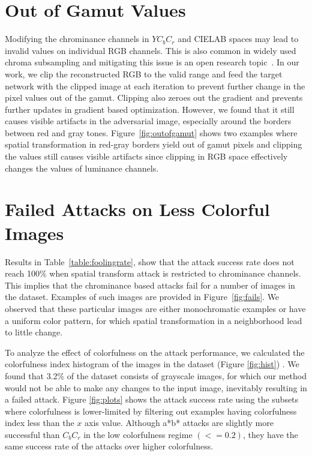\section{Out of Gamut Values}
Modifying the chrominance channels in \(YC_{b}C_{r}\) and CIELAB spaces may lead to invalid values on individual RGB channels. This is also common in widely used chroma subsampling and mitigating this issue is an open research topic~\cite{chan2008toward}. In our work, we clip the reconstructed RGB to the valid range and feed the target network with the clipped image at each iteration to prevent further change in the pixel values out of the gamut. Clipping also zeroes out the gradient and prevents further updates in gradient based optimization. However, we found that it still causes visible artifacts in the adversarial image, especially around the borders between red and gray tones. Figure~\ref{fig:outofgamut} shows two examples where spatial transformation in red-gray borders yield out of gamut pixels and clipping the values still causes visible artifacts since clipping in RGB space effectively changes the values of luminance channels.

\section{Failed Attacks on Less Colorful Images}
Results in Table~\ref{table:foolingrate}, show that the attack success rate does not reach 100\% when spatial transform attack is restricted to chrominance channels.  %
This implies that the chrominance based attacks fail for a number of images in the dataset. Examples of such images are provided in Figure~\ref{fig:fails}. We observed that these  particular images are either monochromatic examples or have a uniform color pattern, for which spatial transformation in a neighborhood lead to little change.

To analyze the effect of colorfulness on the attack performance, we calculated the colorfulness index histogram of the images in the dataset (Figure \ref{fig:hist}) . We found that 3.2\% of the dataset consists of grayscale images, for which our method would not be able to make any changes to the input image, inevitably resulting in a failed attack. Figure \ref{fig:plots} shows the attack success rate using the subsets where colorfulness is lower-limited by filtering out examples having colorfulness index less than the \(x\) axis value. Although a*b* attacks are slightly more successful than \(C_bC_r\) in the low colorfulness regime \((<=0.2)\), they have the same success rate of the attacks over higher colorfulness.

